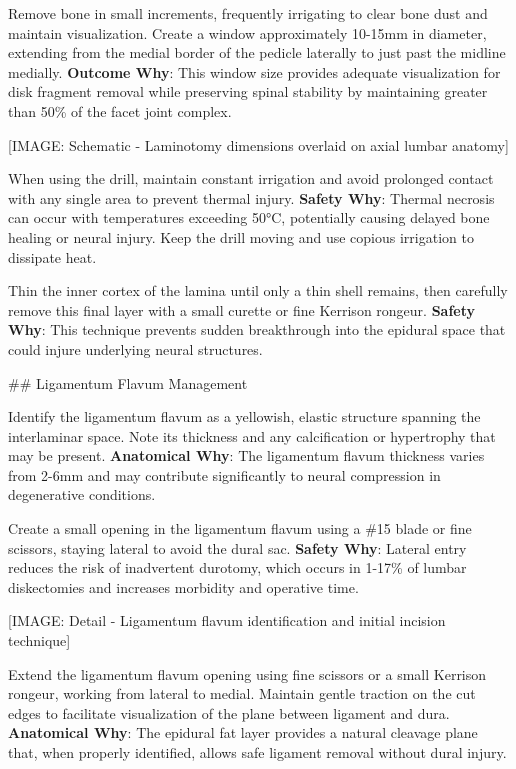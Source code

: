 \documentclass[12pt,a4paper]{article}
\begin{document}
Remove bone in small increments, frequently irrigating to clear bone dust and maintain visualization. Create a window approximately 10-15mm in diameter, extending from the medial border of the pedicle laterally to just past the midline medially. \textbf{Outcome Why}: This window size provides adequate visualization for disk fragment removal while preserving spinal stability by maintaining greater than 50\% of the facet joint complex.

[IMAGE: Schematic - Laminotomy dimensions overlaid on axial lumbar anatomy]

When using the drill, maintain constant irrigation and avoid prolonged contact with any single area to prevent thermal injury. \textbf{Safety Why}: Thermal necrosis can occur with temperatures exceeding 50°C, potentially causing delayed bone healing or neural injury. Keep the drill moving and use copious irrigation to dissipate heat.

Thin the inner cortex of the lamina until only a thin shell remains, then carefully remove this final layer with a small curette or fine Kerrison rongeur. \textbf{Safety Why}: This technique prevents sudden breakthrough into the epidural space that could injure underlying neural structures.

\#\# Ligamentum Flavum Management

Identify the ligamentum flavum as a yellowish, elastic structure spanning the interlaminar space. Note its thickness and any calcification or hypertrophy that may be present. \textbf{Anatomical Why}: The ligamentum flavum thickness varies from 2-6mm and may contribute significantly to neural compression in degenerative conditions.

Create a small opening in the ligamentum flavum using a \#15 blade or fine scissors, staying lateral to avoid the dural sac. \textbf{Safety Why}: Lateral entry reduces the risk of inadvertent durotomy, which occurs in 1-17\% of lumbar diskectomies and increases morbidity and operative time.

[IMAGE: Detail - Ligamentum flavum identification and initial incision technique]

Extend the ligamentum flavum opening using fine scissors or a small Kerrison rongeur, working from lateral to medial. Maintain gentle traction on the cut edges to facilitate visualization of the plane between ligament and dura. \textbf{Anatomical Why}: The epidural fat layer provides a natural cleavage plane that, when properly identified, allows safe ligament removal without dural injury.
\end{document}
